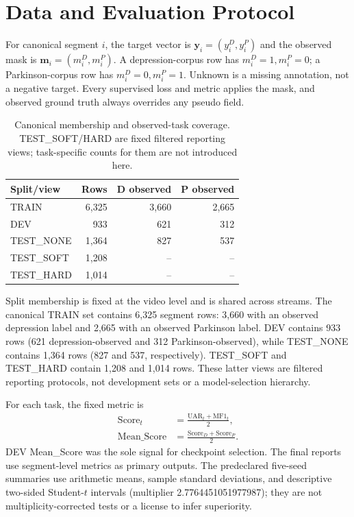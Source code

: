 \section{Data and Evaluation Protocol}
\label{sec:protocol}

For canonical segment $i$, the target vector is $\mathbf{y}_i=(y_i^D,y_i^P)$ and the observed mask is $\mathbf{m}_i=(m_i^D,m_i^P)$. A depression-corpus row has $m_i^D=1,m_i^P=0$; a Parkinson-corpus row has $m_i^D=0,m_i^P=1$. Unknown is a missing annotation, not a negative target. Every supervised loss and metric applies the mask, and observed ground truth always overrides any pseudo field.

\begin{table}[t]
\centering\small
\caption{Canonical membership and observed-task coverage. TEST\_SOFT/HARD are fixed filtered reporting views; task-specific counts for them are not introduced here.}
\label{tab:splits}
\begin{tabular}{lrrr}
\toprule
Split/view & Rows & D observed & P observed\\
\midrule
TRAIN & 6,325 & 3,660 & 2,665\\
DEV & 933 & 621 & 312\\
TEST\_NONE & 1,364 & 827 & 537\\
TEST\_SOFT & 1,208 & -- & --\\
TEST\_HARD & 1,014 & -- & --\\
\bottomrule
\end{tabular}
\end{table}

Split membership is fixed at the video level and is shared across streams. The canonical TRAIN set contains 6,325 segment rows: 3,660 with an observed depression label and 2,665 with an observed Parkinson label. DEV contains 933 rows (621 depression-observed and 312 Parkinson-observed), while TEST\_NONE contains 1,364 rows (827 and 537, respectively). TEST\_SOFT and TEST\_HARD contain 1,208 and 1,014 rows. These latter views are filtered reporting protocols, not development sets or a model-selection hierarchy.

For each task, the fixed metric is
\begin{equation}
\begin{aligned}
 \mathrm{Score}_{t}&=\frac{\mathrm{UAR}_{t}+\mathrm{MF1}_{t}}{2},\\
 \mathrm{Mean\_Score}&=\frac{\mathrm{Score}_{D}+\mathrm{Score}_{P}}{2}.
\end{aligned}
 \label{eq:score}
\end{equation}
DEV Mean\_Score was the sole signal for checkpoint selection. The final reports use segment-level metrics as primary outputs. The predeclared five-seed summaries use arithmetic means, sample standard deviations, and descriptive two-sided Student-$t$ intervals (multiplier 2.7764451051977987); they are not multiplicity-corrected tests or a license to infer superiority.

